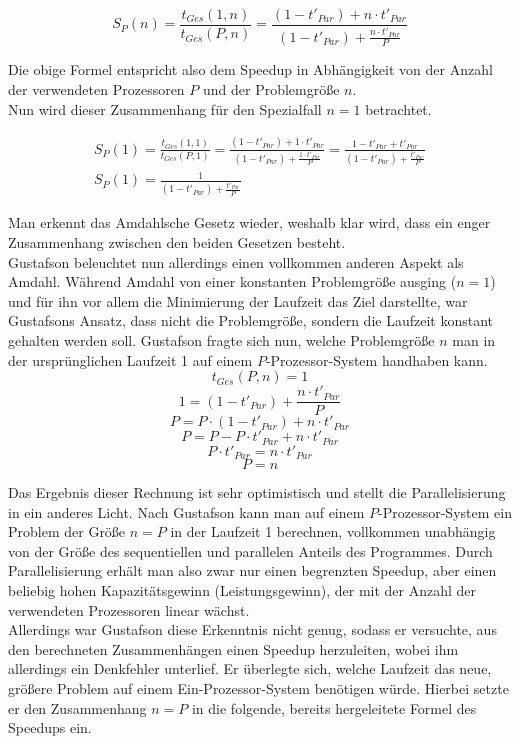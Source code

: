 				\[ S_P(n) = \frac{t_{Ges}(1, n)}{t_{Ges}(P, n)} = \frac{(1 - t'_{Par}) + n \cdot t'_{Par}}{(1 - t'_{Par}) + \frac{n \cdot t'_{Par}}{P}} \]
				
				Die obige Formel entspricht also dem Speedup in Abhängigkeit von der Anzahl der verwendeten Prozessoren $P$ und der Problemgröße $n$.\\
				Nun wird dieser Zusammenhang für den Spezialfall $n = 1$ betrachtet.
				
				\begin{align*} 
					S_P(1) = \frac{t_{Ges}(1, 1)}{t_{Ges}(P, 1)} = \frac{(1 - t'_{Par}) + 1 \cdot t'_{Par}}{(1 - t'_{Par}) + \frac{1 \cdot t'_{Par}}{P}} = \frac{1 - t'_{Par} + t'_{Par}}{(1 - t'_{Par}) + \frac{t'_{Par}}{P}}\\
					S_P(1) = \frac{1}{(1 - t'_{Par}) + \frac{t'_{Par}}{P}}
				\end{align*}

				Man erkennt das Amdahlsche Gesetz wieder, weshalb klar wird, dass ein enger Zusammenhang zwischen den beiden Gesetzen besteht.\\
				Gustafson beleuchtet nun allerdings einen vollkommen anderen Aspekt als Amdahl. Während Amdahl von einer konstanten Problemgröße ausging ($n = 1$) und für ihn vor allem die Minimierung der Laufzeit das Ziel darstellte, war Gustafsons Ansatz, dass nicht die Problemgröße, sondern die Laufzeit konstant gehalten werden soll. Gustafson fragte sich nun, welche Problemgröße $n$ man in der ursprünglichen Laufzeit 1 auf einem $P$-Prozessor-System handhaben kann.\\
				
				\[ t_{Ges}(P, n) = 1 \]
				\[ 1 = (1 - t'_{Par}) + \frac{n \cdot t'_{Par}}{P} \]
				\[ P = P \cdot (1 - t'_{Par}) + n \cdot t'_{Par} \]
				\[ P = P - P \cdot t'_{Par} + n \cdot t'_{Par} \]
				\[ P \cdot t'_{Par} = n \cdot t'_{Par} \]
				\[ P = n \]
				
				Das Ergebnis dieser Rechnung ist sehr optimistisch und stellt die Parallelisierung in ein anderes Licht. Nach Gustafson kann man auf einem $P$-Prozessor-System ein Problem der Größe $n = P$ in der Laufzeit 1 berechnen, vollkommen unabhängig von der Größe des sequentiellen und parallelen Anteils des Programmes. Durch Parallelisierung erhält man also zwar nur einen begrenzten Speedup, aber einen beliebig hohen Kapazitätsgewinn (Leistungsgewinn), der mit der Anzahl der verwendeten Prozessoren linear wächst.\\
				Allerdings war Gustafson diese Erkenntnis nicht genug, sodass er versuchte, aus den berechneten Zusammenhängen einen Speedup herzuleiten, wobei ihm allerdings ein Denkfehler unterlief. Er überlegte sich, welche Laufzeit das neue, größere Problem auf einem Ein-Prozessor-System benötigen würde. Hierbei setzte er den Zusammenhang $n = P$ in die folgende, bereits hergeleitete Formel des Speedups ein.
				
